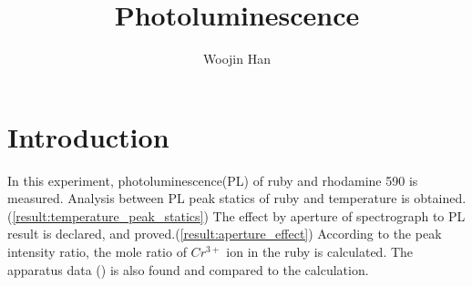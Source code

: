 \documentclass{article}
\begin{document}
\title{Photoluminescence}
\author[1]{Woojin Han}
\maketitle
\begin{abstract}

\end{abstract}

\section{Introduction}
 In this experiment, photoluminescence(PL) of ruby and rhodamine 590 is measured.
 Analysis between PL peak statics of ruby and temperature is obtained.(\ref{result:temperature_peak_statics})
 The effect by aperture of spectrograph to PL result is declared, and proved.(\ref{result:aperture_effect})
 According to the peak intensity ratio, the mole ratio of $Cr^{3+}$ ion in the ruby is calculated.
 The apparatus data () is also found and compared to the calculation.
\end{document}
